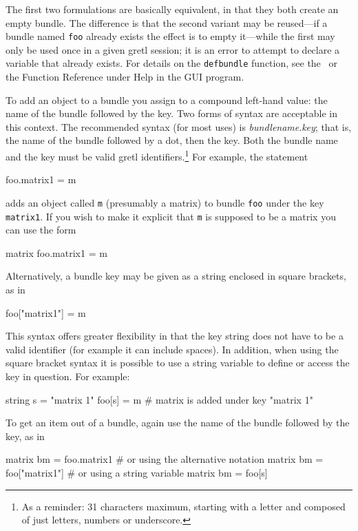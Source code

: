 The first two formulations are basically equivalent, in that they both
create an empty bundle. The difference is that the second variant may
be reused---if a bundle named \texttt{foo} already exists the effect
is to empty it---while the first may only be used once in a given
gretl session; it is an error to attempt to declare a variable that
already exists. For details on the \texttt{defbundle} function, see
the \GCR\ or the \textsf{Function Reference} under \textsf{Help} in
the GUI program.

To add an object to a bundle you assign to a compound left-hand value:
the name of the bundle followed by the key. Two forms of syntax are
acceptable in this context. The recommended syntax (for most uses) is
\textsl{bundlename}.\textsl{key}; that is, the name of the bundle
followed by a dot, then the key. Both the bundle name and the key must
be valid gretl identifiers.\footnote{As a reminder: 31 characters
  maximum, starting with a letter and composed of just letters,
  numbers or underscore.} For example, the statement
%
\begin{code}
foo.matrix1 = m
\end{code}
%
adds an object called \texttt{m} (presumably a matrix) to bundle
\texttt{foo} under the key \texttt{matrix1}. If you wish to make it
explicit that \texttt{m} is supposed to be a matrix you can use the
form
%
\begin{code}
matrix foo.matrix1 = m
\end{code}

Alternatively, a bundle key may be given as a string enclosed in
square brackets, as in
%
\begin{code}
foo["matrix1"] = m
\end{code}
%
This syntax offers greater flexibility in that the key string does not
have to be a valid identifier (for example it can include spaces). In
addition, when using the square bracket syntax it is possible to use a
string variable to define or access the key in question. For example:
%
\begin{code}
string s = "matrix 1"
foo[s] = m # matrix is added under key "matrix 1"
\end{code}

To get an item out of a bundle, again use the name of the bundle
followed by the key, as in

\begin{code}
matrix bm = foo.matrix1
# or using the alternative notation
matrix bm = foo["matrix1"]
# or using a string variable
matrix bm = foo[s]
\end{code}


